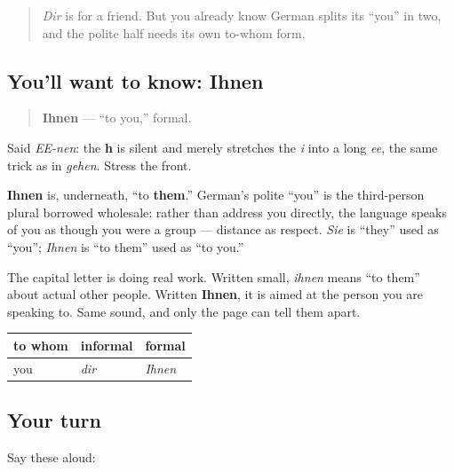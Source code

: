 \label{lesson:GE-C03-ihnen}



\begin{quote}
\emph{Dir} is for a friend. But you already know German splits its \textquotedblleft{}you\textquotedblright{} in two, and the polite half needs its own to-whom form.
\end{quote}

\subsection*{You'll want to know: Ihnen}
\begin{quote}
\textbf{Ihnen} — \textquotedblleft{}to you,\textquotedblright{} formal.
\end{quote}

Said \emph{EE-nen}: the \textbf{h} is silent and merely stretches the \emph{i} into a long \emph{ee}, the same trick as in \emph{gehen}. Stress the front.

\begin{cousinweb}
\textbf{Ihnen} is, underneath, \textquotedblleft{}to \textbf{them}.\textquotedblright{} German's polite \textquotedblleft{}you\textquotedblright{} is the third-person plural borrowed wholesale: rather than address you directly, the language speaks of you as though you were a group — distance as respect. \emph{Sie} is \textquotedblleft{}they\textquotedblright{} used as \textquotedblleft{}you\textquotedblright{}; \emph{Ihnen} is \textquotedblleft{}to them\textquotedblright{} used as \textquotedblleft{}to you.\textquotedblright{}

The capital letter is doing real work. Written small, \emph{ihnen} means \textquotedblleft{}to them\textquotedblright{} about actual other people. Written \textbf{Ihnen}, it is aimed at the person you are speaking to. Same sound, and only the page can tell them apart.

\noindent
\begin{tabularx}{\linewidth}{@{}>{\raggedright\arraybackslash}X>{\raggedright\arraybackslash}X>{\raggedright\arraybackslash}X@{}}
\toprule
\textbf{to whom} & \textbf{informal} & \textbf{formal} \\
\midrule
you & \emph{dir} & \emph{Ihnen} \\
\bottomrule
\end{tabularx}
\end{cousinweb}

\subsection*{Your turn}
Say these aloud:

